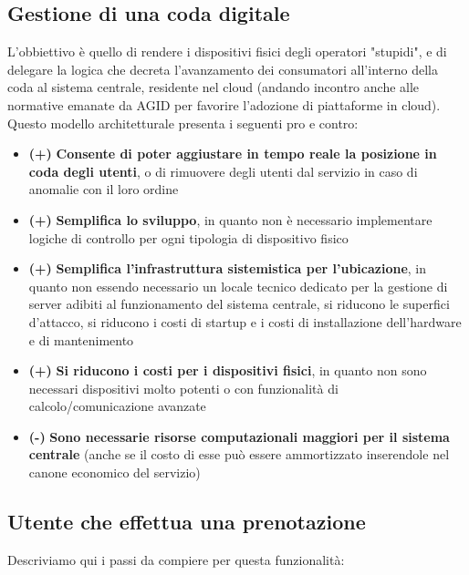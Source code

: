 \documentclass[a4paper, titlepage, 12pt, openright, twoside]{book}
\begin{document}
\subsection{Gestione di una coda digitale}
L'obbiettivo è quello di rendere i dispositivi fisici degli operatori "stupidi", e di delegare la logica che decreta l'avanzamento dei consumatori all'interno della coda al sistema centrale, residente nel cloud (andando incontro anche alle normative emanate da AGID per favorire l'adozione di piattaforme in cloud).
Questo modello architetturale presenta i seguenti pro e contro:
\begin{itemize}
	\item \textbf{(+)} \textbf{Consente di poter aggiustare in tempo reale la posizione in coda degli utenti}, o di rimuovere degli utenti dal servizio in caso di anomalie con il loro 						ordine
	\item \textbf{(+)} \textbf{Semplifica lo sviluppo}, in quanto non è necessario implementare logiche di controllo per ogni tipologia di dispositivo fisico
	\item \textbf{(+)} \textbf{Semplifica l'infrastruttura sistemistica per l'ubicazione}, in quanto non essendo necessario un locale tecnico dedicato per la gestione di server adibiti al funzionamento del sistema centrale, si riducono le superfici d'attacco, si riducono i costi di startup e i costi di installazione dell'hardware e di mantenimento
	\item \textbf{(+)} \textbf{Si riducono i costi per i dispositivi fisici}, in quanto non sono necessari dispositivi molto potenti o con funzionalità di calcolo/comunicazione avanzate
	\item \textbf{(-)} \textbf{Sono necessarie risorse computazionali maggiori per il sistema centrale} (anche se il costo di esse può essere ammortizzato inserendole nel canone economico del servizio)
\end{itemize}

\subsection{Utente che effettua una prenotazione}

Descriviamo qui i passi da compiere per questa funzionalità:
\end{document}
